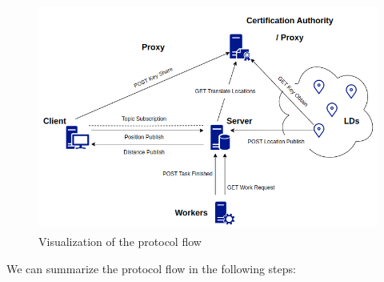 \documentclass[12pt,a4paper,twoside]{book}
\begin{document}
\begin{figure}[h]
    \centering
    \includegraphics[width=12cm,height=7.5cm]{img/workflow.png}
    \caption{Visualization of the protocol flow}
    \label{fig:protocol-flow}
\end{figure}

We can summarize the protocol flow in the following steps:
\end{document}
